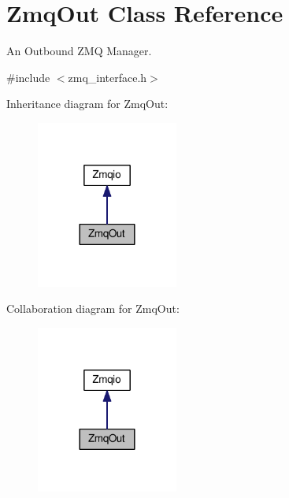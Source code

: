 \hypertarget{classZmqOut}{}\section{Zmq\+Out Class Reference}
\label{classZmqOut}


An Outbound Z\+MQ Manager.  




{\ttfamily \#include $<$zmq\+\_\+interface.\+h$>$}



Inheritance diagram for Zmq\+Out\+:
\nopagebreak
\begin{figure}[H]
\begin{center}
\leavevmode
\includegraphics[width=132pt]{classZmqOut__inherit__graph}
\end{center}
\end{figure}


Collaboration diagram for Zmq\+Out\+:
\nopagebreak
\begin{figure}[H]
\begin{center}
\leavevmode
\includegraphics[width=132pt]{classZmqOut__coll__graph}
\end{center}
\end{figure}
